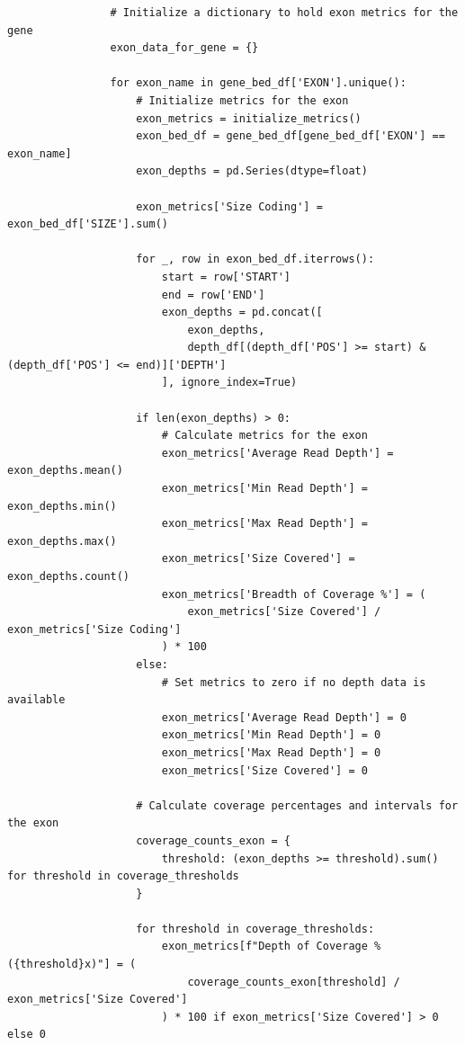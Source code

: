 \begin{longlisting}
\begin{verbatim}
                # Initialize a dictionary to hold exon metrics for the gene
                exon_data_for_gene = {}
                
                for exon_name in gene_bed_df['EXON'].unique():
                    # Initialize metrics for the exon
                    exon_metrics = initialize_metrics()
                    exon_bed_df = gene_bed_df[gene_bed_df['EXON'] == exon_name]
                    exon_depths = pd.Series(dtype=float)
                    
                    exon_metrics['Size Coding'] = exon_bed_df['SIZE'].sum()

                    for _, row in exon_bed_df.iterrows():
                        start = row['START']
                        end = row['END']
                        exon_depths = pd.concat([
                            exon_depths,
                            depth_df[(depth_df['POS'] >= start) & (depth_df['POS'] <= end)]['DEPTH']
                        ], ignore_index=True)

                    if len(exon_depths) > 0:
                        # Calculate metrics for the exon
                        exon_metrics['Average Read Depth'] = exon_depths.mean()
                        exon_metrics['Min Read Depth'] = exon_depths.min()
                        exon_metrics['Max Read Depth'] = exon_depths.max()
                        exon_metrics['Size Covered'] = exon_depths.count()
                        exon_metrics['Breadth of Coverage %'] = (
                            exon_metrics['Size Covered'] / exon_metrics['Size Coding']
                        ) * 100
                    else:
                        # Set metrics to zero if no depth data is available
                        exon_metrics['Average Read Depth'] = 0
                        exon_metrics['Min Read Depth'] = 0
                        exon_metrics['Max Read Depth'] = 0
                        exon_metrics['Size Covered'] = 0

                    # Calculate coverage percentages and intervals for the exon
                    coverage_counts_exon = {
                        threshold: (exon_depths >= threshold).sum() for threshold in coverage_thresholds
                    }

                    for threshold in coverage_thresholds:
                        exon_metrics[f"Depth of Coverage % ({threshold}x)"] = (
                            coverage_counts_exon[threshold] / exon_metrics['Size Covered']
                        ) * 100 if exon_metrics['Size Covered'] > 0 else 0


\end{verbatim}
\end{longlisting}
